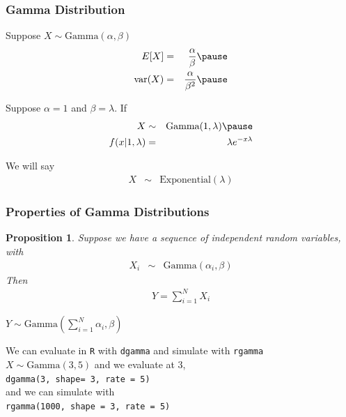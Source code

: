 \documentclass[handout]{beamer}
\newtheorem{prop}{Proposition}
\numberwithin{equation}{section}
\begin{document}
\begin{frame}
\frametitle{Gamma Distribution}

Suppose $X \sim \text{Gamma}(\alpha, \beta)$ \pause 
\begin{eqnarray}
E[X] & = & \frac{\alpha}{\beta} \nonumber \pause\\
\text{var}(X) & = & \frac{\alpha}{\beta^2} \nonumber \pause\\
\end{eqnarray}



Suppose $\alpha = 1$ and $\beta = \lambda$.  If \pause\\
\begin{eqnarray}
X & \sim & \text{Gamma}(1, \lambda) \nonumber \pause\\
f(x|1, \lambda ) & = & \lambda e^{- x \lambda}  \nonumber
\end{eqnarray}



We will say \pause 
\begin{eqnarray}
X & \sim & \text{Exponential}(\lambda) \nonumber 
\end{eqnarray}


\end{frame}

\begin{frame}
\frametitle{Properties of Gamma Distributions}

\begin{prop}
Suppose we have a sequence of independent random variables, with 
\begin{eqnarray}
X_{i} & \sim & \text{Gamma}(\alpha_{i}, \beta) \nonumber 
\end{eqnarray}
Then 
\begin{eqnarray}
Y = \sum_{i=1}^{N} X_{i} \nonumber 
\end{eqnarray}

$Y \sim \text{Gamma}(\sum_{i=1}^{N} \alpha_{i} , \beta) $


\end{prop}


\end{frame}





\begin{frame}
We can evaluate in {\tt R} with {\tt dgamma} and simulate with {\tt rgamma}\\

$X \sim \text{Gamma}(3, 5)$ and we evaluate at 3, \\
{\tt dgamma(3, shape= 3, rate = 5)}\\
and we can simulate with \\
{\tt rgamma(1000, shape = 3, rate = 5)} 




\end{frame}
\end{document}
